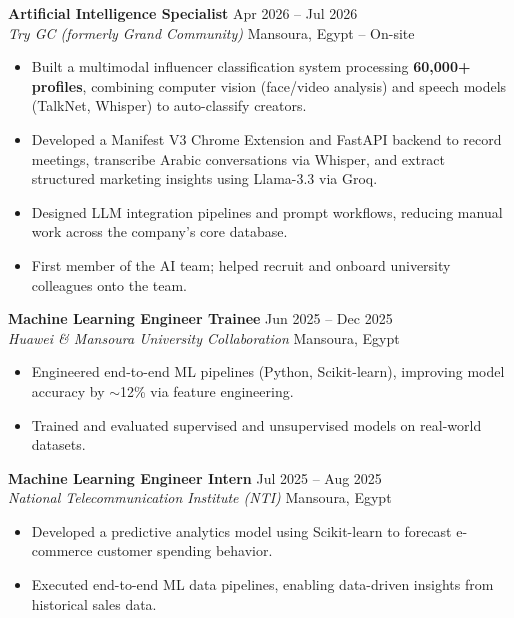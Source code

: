 \documentclass[a4paper,10pt]{article}
\begin{document}
\vspace{2mm}

\textbf{Artificial Intelligence Specialist} \hfill Apr 2026 -- Jul 2026 \\
\textit{Try GC (formerly Grand Community)} \hfill Mansoura, Egypt -- On-site
\begin{itemize}[noitemsep, topsep=0pt, leftmargin=*]
    \item Built a multimodal influencer classification system processing \textbf{60,000+ profiles}, combining computer vision (face/video analysis) and speech models (TalkNet, Whisper) to auto-classify creators.
    \item Developed a Manifest V3 Chrome Extension and FastAPI backend to record meetings, transcribe Arabic conversations via Whisper, and extract structured marketing insights using Llama-3.3 via Groq.
    \item Designed LLM integration pipelines and prompt workflows, reducing manual work across the company's core database.
    \item First member of the AI team; helped recruit and onboard university colleagues onto the team.
\end{itemize}

\vspace{2mm}

\textbf{Machine Learning Engineer Trainee} \hfill Jun 2025 -- Dec 2025 \\
\textit{Huawei \& Mansoura University Collaboration} \hfill Mansoura, Egypt
\begin{itemize}[noitemsep, topsep=0pt, leftmargin=*]
    \item Engineered end-to-end ML pipelines (Python, Scikit-learn), improving model accuracy by $\sim$12\% via feature engineering.
    \item Trained and evaluated supervised and unsupervised models on real-world datasets.
\end{itemize}

\vspace{2mm}

\textbf{Machine Learning Engineer Intern} \hfill Jul 2025 -- Aug 2025 \\
\textit{National Telecommunication Institute (NTI)} \hfill Mansoura, Egypt
\begin{itemize}[noitemsep, topsep=0pt, leftmargin=*]
    \item Developed a predictive analytics model using Scikit-learn to forecast e-commerce customer spending behavior.
    \item Executed end-to-end ML data pipelines, enabling data-driven insights from historical sales data.
\end{itemize}
\end{document}

